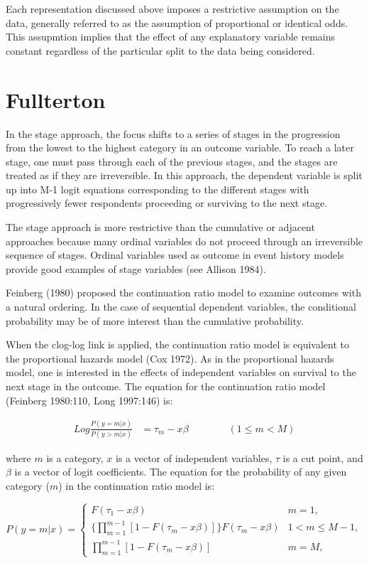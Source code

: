 Each representation discussed above imposes a restrictive assumption on the data, generally referred to as the assumption of proportional or identical odds. This assupmtion implies that the effect of any explanatory variable remains constant regardless of the particular split to the data being considered.

\section{Fullterton}

In the stage approach, the focus shifts to a series of stages in the progression from the lowest to the highest category in an outcome variable. To reach a later stage, one must pass through each of the previous stages, and the stages are treated as if they are irreversible. In this approach, the dependent variable is split up into M-1 logit equations corresponding to the different stages with progressively fewer respondents proceeding or surviving to the next stage.

The stage approach is more restrictive than the cumulative or adjacent approaches because many ordinal variables do not proceed through an irreversible sequence of stages. Ordinal variables used as outcome in event history models provide good examples of stage variables (see Allison 1984).

Feinberg (1980) proposed the continuation ratio model to examine outcomes with a natural ordering. In the case of sequential dependent variables, the conditional probability may be of more interest than the cumulative probability.

When the clog-log link is applied, the continuation ratio model is equivalent to the proportional hazards model (Cox 1972). As in the proportional hazards model, one is interested in the effects of independent variables on survival to the next stage in the outcome. The equation for the continuation ratio model (Feinberg 1980:110, Long 1997:146) is:

\begin{align*}
Log \frac{P(y=m|x)}{P(y>m|x)} &= \tau_{m} - x\beta \qquad\qquad (1 \leq m < M)
\end{align*}

where $m$ is a category, $x$ is a vector of independent variables, $\tau$ is a cut point, and $\beta$ is a vector of logit coefficients. The equation for the probability of any given category ($m$) in the continuation ratio model is:

\begin{equation*}
P(y = m | x) =
\begin{cases}
F(\tau_{1} - x\beta) & m=1,\\
\{ \prod_{m=1}^{m-1} [1-F(\tau_{m} - x\beta)] \} F(\tau_{m} - x\beta) & 1 < m \leq M - 1, \\
\prod_{m=1}^{m-1} [1-F(\tau_{m} - x\beta)] & m=M,
\end{cases}
\end{equation*}

